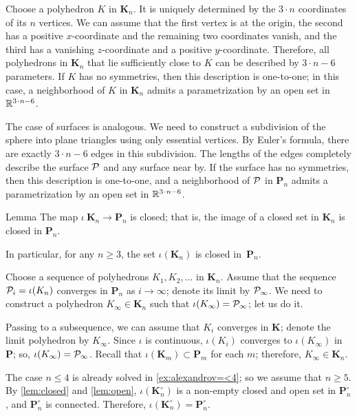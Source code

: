 Choose a polyhedron $K$ in $\bm{K}_n$.
It is uniquely determined by the $3\cdot n$ coordinates of its $n$ vertices.
We can assume that the first vertex is at the origin,
the second has a positive $x$-coordinate
and the remaining two coordinates vanish,
and the third has a vanishing $z$-coordinate and a positive $y$-coordinate.
Therefore, all polyhedrons in $\bm{K}_n$ that lie sufficiently close to $K$ can be described by $3\cdot n-6$ parameters.
If $K$ has no symmetries, then this description is one-to-one;
in this case, a neighborhood of $K$ in $\bm{K}_n$ admits a parametrization by an open set in $\RR^{3\cdot n-6}$.

The case of surfaces is analogous.
We need to construct a subdivision of the sphere into plane triangles using only essential vertices.
By Euler's formula, there are exactly $3\cdot n-6$ edges in this subdivision.
The lengths of the edges completely describe the surface $\mathcal{P}$ and any surface near by.
If the surface has no symmetries, then this description is one-to-one, and a neighborhood of $\mathcal{P}$ in $\bm{P}_n$ admits a parametrization by an open set in  $\RR^{3\cdot n-6}$.

\begin{thm}{Lemma}\label{lem:closed}
The map $\iota\:\bm{K}_n\to\bm{P}_n$ is closed;
that is, the image of a closed set in $\bm{K}_n$ is closed in $\bm{P}_n$.

In particular, for any $n\ge 3$, the set $\iota(\bm{K}_n)$ is closed in~$\bm{P}_n$.
\end{thm}

Choose a sequence of polyhedrons $K_1,K_2,\ldots$ in $\bm{K}_n$.
Assume that the sequence $\mathcal{P}_i=\iota(K_n)$ converges in $\bm{P}_n$ as $i\to \infty$;
denote its limit by $\mathcal{P}_\infty$.
We need to construct a polyhedron $K_\infty\in \bm{K}_n$ such that $\iota(K_\infty)=\mathcal{P}_\infty$;
let us do it.

Passing to a subsequence, we can assume that $K_i$ converges in $\bm{K}$;
denote the limit polyhedron by $K_\infty$.
Since $\iota$ is continuous, $\iota(K_i)$ converges to $\iota(K_\infty)$ in~$\bm{P}$; so, $\iota(K_\infty)=\mathcal{P}_\infty$.
Recall that $\iota(\bm{K}_m)\subset\bm{P}_m$ for each $m$; therefore, $K_\infty\in \bm{K}_n$.


The case $n\le 4$ is already solved in \ref{ex:alexandrov=<4}; so we assume that $n\ge 5$.
By \ref{lem:closed} and \ref{lem:open},
$\iota(\bm{K}_n^\circ)$ is a non-empty closed and open set in $\bm{P}_n^\circ$, and $\bm{P}_n^\circ$ is connected.
Therefore, $\iota(\bm{K}_n^\circ)=\bm{P}_n^\circ$.

